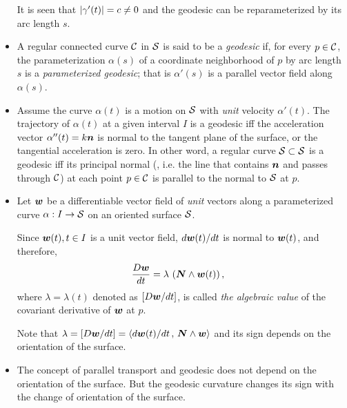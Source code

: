 \documentclass[11pt]{article}
\begin{document}
\begin{itemize}
\begin{definition}
It is seen that $\left\lvert \gamma'(t) \right\rvert = c\neq 0$ and the geodesic can be reparameterized by its arc length $s$.
\end{definition}

\item \begin{definition}
A regular connected curve ${\mathcal C}$ in ${\mathcal S}$ is said to be a \emph{geodesic} if, for every $p\in {\mathcal C}$, the parameterization $\alpha(s)$ of a coordinate neighborhood of $p$ by arc length $s$ is a \emph{parameterized geodesic}; that is $\alpha'(s)$ is a parallel vector field along $\alpha(s)$.
\end{definition}

\item \begin{remark} Assume the curve $\alpha(t)$ is a motion on ${\mathcal S}$ with \emph{unit} velocity $\alpha'(t)$. The trajectory of $\alpha(t)$ at a given interval $I$ is a geodesic iff the acceleration vector $\alpha''(t) = k\boldsymbol{n}$ is normal to the tangent plane of the surface, or the tangential acceleration is zero. In other word, a regular curve ${\mathcal S} \subset {\mathcal S}$ is a geodesic iff its principal normal (, i.e. the line that contains $\boldsymbol{n}$ and passes through ${\mathcal C}$) at each point $p\in {\mathcal C}$ is parallel to the normal to ${\mathcal S}$ at $p$.\\
\end{remark}
  
\item Let $\boldsymbol{w}$ be a differentiable vector field of \emph{unit} vectors along a parameterized curve $\alpha: I \rightarrow {\mathcal S}$ on an oriented surface ${\mathcal S}$. 
\begin{definition}
Since $\boldsymbol{w}(t), t\in I$ is a unit vector field, $d\boldsymbol{w}(t)/dt$ is normal to $\boldsymbol{w}(t)$, and therefore, 
\begin{align*}
\frac{D\boldsymbol{w}}{dt} &= \lambda\,\left(\boldsymbol{N} \wedge \boldsymbol{w}(t)\right),
\end{align*} 
where $\lambda = \lambda(t)$ denoted as $\left[D\boldsymbol{w}/dt\right]$, is called \emph{the algebraic value} of the covariant derivative of $\boldsymbol{w}$ at $p$.
\end{definition}

Note that $\lambda = \left[D\boldsymbol{w}/dt\right] = \left\langle d\boldsymbol{w}(t)/dt\,,\, \boldsymbol{N} \wedge \boldsymbol{w} \right\rangle$ and its sign depends on the orientation of the surface. 

\item  \begin{remark}
The concept of parallel transport and geodesic does not depend on the orientation of the surface. But the geodesic curvature changes its sign with the change of orientation of the surface. 
\end{remark}


\end{itemize}
\end{document}
